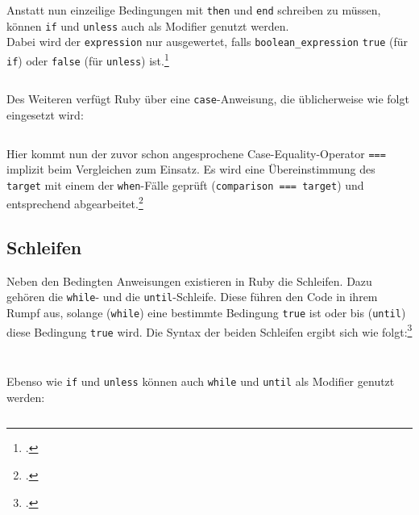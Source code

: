 \documentclass[a4paper, 11pt]{scrreprt}
\begin{document}
Anstatt nun einzeilige Bedingungen  mit \texttt{then} und \texttt{end} schreiben zu müssen, können \texttt{if} und \texttt{unless} auch als Modifier genutzt werden.\\
Dabei wird der \texttt{expression} nur ausgewertet, falls \texttt{boolean\_expression} \texttt{true} (für \texttt{if}) oder \texttt{false} (für \texttt{unless}) ist.\footcite[vgl.][S.337]{p_ruby}
\inputminted[]{ruby}{if_unless.rb}

Des Weiteren verfügt Ruby über eine \texttt{case}-Anweisung, die üblicherweise wie folgt eingesetzt wird:
\inputminted[]{ruby}{case1.rb}
Hier kommt nun der zuvor schon angesprochene Case-Equality-Operator \texttt{===} implizit beim Vergleichen zum Einsatz. Es wird eine Übereinstimmung des \texttt{target} mit einem der \texttt{when}-Fälle geprüft (\texttt{comparison === target}) und entsprechend abgearbeitet.\footcite[vgl.][S.338]{p_ruby}

\subsection{Schleifen}
Neben den Bedingten Anweisungen existieren in Ruby die Schleifen. Dazu gehören die \texttt{while}- und die \texttt{until}-Schleife. Diese führen den Code in ihrem Rumpf aus, solange (\texttt{while}) eine bestimmte Bedingung \texttt{true} ist oder bis (\texttt{until}) diese Bedingung  \texttt{true} wird. Die Syntax der beiden Schleifen ergibt sich wie folgt:\footcite[vgl.][S.338]{p_ruby}
\inputminted[]{ruby}{while.rb}
\inputminted[]{ruby}{until.rb}
Ebenso wie \texttt{if} und \texttt{unless} können auch \texttt{while} und \texttt{until} als Modifier genutzt werden:
\inputminted[]{ruby}{while_until.rb}
\end{document}
